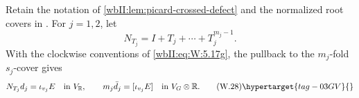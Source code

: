 \begin{lemma}
\hypertarget{tag-03IE}{}\label{wbII:lem:picard-finite-norm}

Retain the notation of
\cref{wbII:lem:picard-crossed-defect} and the normalized root covers in .  For
$j=1,2$, let
\[
 N_{T_j}=I+T_j+\cdots+T_j^{m_j-1}.
\]
With the clockwise conventions of \eqref{wbII:eq:W:5.17g}, the pullback to the
$m_j$-fold $s_j$-cover gives
\[
 N_{T_j}d_j=\iota_{v_j}E
 \quad\text{in }V_{\mathbb R},
\qquad
 m_j\bar d_j=[\iota_{v_j}E]
 \quad\text{in }V_G\otimes\mathbb R.
\tag{W.28}\hypertarget{tag-03GV}{}\label{wbII:eq:W:5.17k}
\]
\end{lemma}



